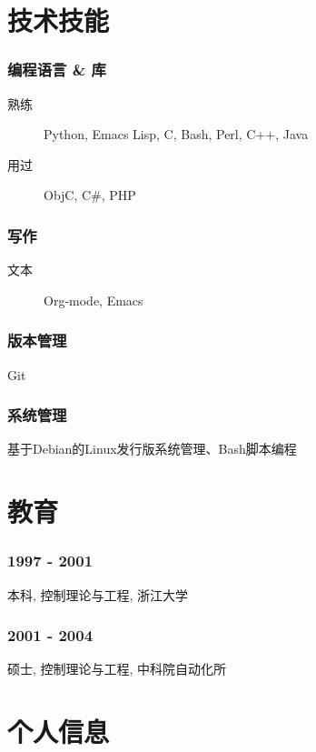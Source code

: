 \documentclass[11pt,dvipdfm,CJKbookmarks]{article}
\begin{document}
\begin{CJK*}{UTF8}{simsun}
\section{技术技能}
\label{sec-3}

\subsubsection{编程语言 \& 库}
\label{sec-3-0-1}
\begin{description}
\item[熟练] Python, Emacs Lisp, C, Bash, Perl, C++, Java

\item[用过] ObjC, C\#, PHP
\end{description}

\subsubsection{写作}
\label{sec-3-0-2}
\begin{description}
\item[文本] Org-mode, Emacs
\end{description}

\subsubsection{版本管理}
\label{sec-3-0-3}
Git

\subsubsection{系统管理}
\label{sec-3-0-4}
基于Debian的Linux发行版系统管理、Bash脚本编程
\section{教育}
\label{sec-4}

\subsubsection{1997 - 2001}
\label{sec-4-0-1}
本科, 控制理论与工程, 浙江大学

\subsubsection{2001 - 2004}
\label{sec-4-0-2}
硕士, 控制理论与工程, 中科院自动化所
\section{个人信息}
\label{sec-5}

\end{CJK*}
\end{document}
